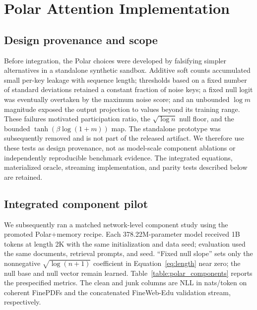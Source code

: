 \section{Polar Attention Implementation}
\label{appendix:polar_implementation}

\subsection{Design provenance and scope}
Before integration, the Polar choices were developed by falsifying simpler alternatives in a standalone synthetic sandbox. Additive soft counts accumulated small per-key leakage with sequence length; thresholds based on a fixed number of standard deviations retained a constant fraction of noise keys; a fixed null logit was eventually overtaken by the maximum noise score; and an unbounded $\log m$ magnitude exposed the output projection to values beyond its training range. These failures motivated participation ratio, the $\sqrt{\log n}$ null floor, and the bounded $\tanh(\beta\log(1+m))$ map. The standalone prototype was subsequently removed and is not part of the released artifact. We therefore use these tests as design provenance, not as model-scale component ablations or independently reproducible benchmark evidence. The integrated equations, materialized oracle, streaming implementation, and parity tests described below are retained.

\subsection{Integrated component pilot}
\label{appendix:polar_components}
We subsequently ran a matched network-level component study using the promoted Polar+memory recipe. Each 378.22M-parameter model received 1B tokens at length 2K with the same initialization and data seed; evaluation used the same documents, retrieval prompts, and seed. ``Fixed null slope'' sets only the nonnegative $\sqrt{\log(n+1)}$ coefficient in Equation~\ref{eq:length} near zero; the null base and null vector remain learned. Table~\ref{table:polar_components} reports the prespecified metrics. The clean and junk columns are NLL in nats/token on coherent FinePDFs and the concatenated FineWeb-Edu validation stream, respectively.

